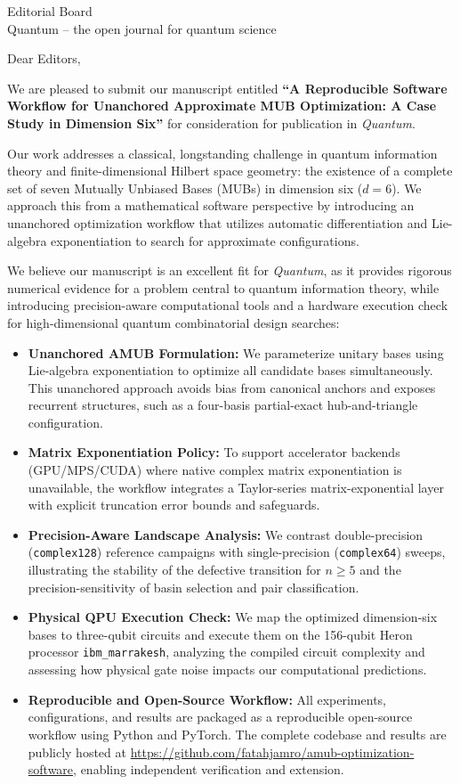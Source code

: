 \documentclass[11pt]{letter}
\begin{document}
\begin{letter}{
  Editorial Board \\
  Quantum -- the open journal for quantum science
}

\opening{Dear Editors,}

We are pleased to submit our manuscript entitled \textbf{``A Reproducible Software Workflow for Unanchored Approximate MUB Optimization: A Case Study in Dimension Six''} for consideration for publication in \textit{Quantum}.

Our work addresses a classical, longstanding challenge in quantum information theory and finite-dimensional Hilbert space geometry: the existence of a complete set of seven Mutually Unbiased Bases (MUBs) in dimension six ($d=6$). We approach this from a mathematical software perspective by introducing an unanchored optimization workflow that utilizes automatic differentiation and Lie-algebra exponentiation to search for approximate configurations.

We believe our manuscript is an excellent fit for \textit{Quantum}, as it provides rigorous numerical evidence for a problem central to quantum information theory, while introducing precision-aware computational tools and a hardware execution check for high-dimensional quantum combinatorial design searches:

\begin{itemize}
    \item \textbf{Unanchored AMUB Formulation:} We parameterize unitary bases using Lie-algebra exponentiation to optimize all candidate bases simultaneously. This unanchored approach avoids bias from canonical anchors and exposes recurrent structures, such as a four-basis partial-exact hub-and-triangle configuration.
    \item \textbf{Matrix Exponentiation Policy:} To support accelerator backends (GPU/MPS/CUDA) where native complex matrix exponentiation is unavailable, the workflow integrates a Taylor-series matrix-exponential layer with explicit truncation error bounds and safeguards.
    \item \textbf{Precision-Aware Landscape Analysis:} We contrast double-precision (\texttt{complex128}) reference campaigns with single-precision (\texttt{complex64}) sweeps, illustrating the stability of the defective transition for $n \ge 5$ and the precision-sensitivity of basin selection and pair classification.
    \item \textbf{Physical QPU Execution Check:} We map the optimized dimension-six bases to three-qubit circuits and execute them on the 156-qubit Heron processor \texttt{ibm\_marrakesh}, analyzing the compiled circuit complexity and assessing how physical gate noise impacts our computational predictions.
    \item \textbf{Reproducible and Open-Source Workflow:} All experiments, configurations, and results are packaged as a reproducible open-source workflow using Python and PyTorch. The complete codebase and results are publicly hosted at \url{https://github.com/fatahjamro/amub-optimization-software}, enabling independent verification and extension.
\end{itemize}


\end{letter}
\end{document}
